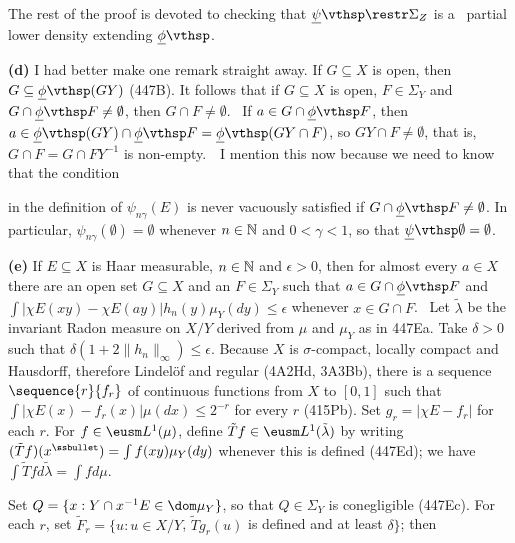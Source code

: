 {

\noindent The rest of the proof is devoted to checking that
$\undpsi\restr\Sigma_Z$ is a \lti\ partial lower density extending
$\undphi$.

\medskip

{\bf (d)} I had better make one remark straight away.   If
$G\subseteq X$ is open, then $G\subseteq\undphi(GY)$ (447B).
It follows that if $G\subseteq X$ is open, $F\in\Sigma_Y$ and
$G\cap\undphi F\ne\emptyset$, then $G\cap F\ne\emptyset$.   \Prf\ If
$a\in G\cap\undphi F$, then $a\in\undphi(GY)\cap\undphi F=\undphi(GY\cap
F)$, so $GY\cap F\ne\emptyset$, that is, $G\cap F=G\cap FY^{-1}$ is
non-empty.\ \QeD\  I mention this now because we need to know that the
condition


\noindent in the definition of $\psi_{n\gamma}(E)$ is never vacuously
satisfied if $G\cap\undphi F\ne\emptyset$.   In particular,
$\psi_{n\gamma}(\emptyset)=\emptyset$ whenever $n\in\Bbb N$ and
$0<\gamma<1$, so that $\undpsi\emptyset=\emptyset$.

\medskip

{\bf (e)} If $E\subseteq X$ is Haar measurable, $n\in\Bbb N$ and
$\epsilon>0$, then for almost every $a\in X$ there are an open set
$G\subseteq X$ and an $F\in\Sigma_Y$ such that $a\in G\cap\undphi F$ and
$\int|\chi E(xy)-\chi E(ay)|h_n(y)\mu_Y(dy)\le\epsilon$ whenever
$x\in G\cap F$.   \Prf\ Let
$\tilde\lambda$ be the invariant Radon measure on $X/Y$ derived from $\mu$
and $\mu_Y$ as in 447Ea.
Take $\delta>0$ such that
$\delta(1+2\|h_n\|_{\infty})\le\epsilon$.   Because $X$ is
$\sigma$-compact, locally compact and Hausdorff, therefore Lindel\"of
and regular (4A2Hd, 3A3Bb), there is a sequence
$\sequence{r}{f_r}$ of continuous functions from $X$ to $[0,1]$ such
that $\int|\chi E(x)-f_r(x)|\mu(dx)\le 2^{-r}$ for every $r$
(415Pb).   Set $g_r=|\chi E-f_r|$ for each $r$.
For $f\in\eusm L^1(\mu)$, define $\tilde Tf\in\eusm L^1(\tilde\lambda)$ by writing $(\tilde Tf)(x^{\ssbullet})=\int f(xy)\mu_Y(dy)$ whenever this is defined (447Ed);
we have $\int\tilde Tfd\tilde\lambda=\int fd\mu$.

Set $Q=\{x:Y\cap x^{-1}E\in\dom\mu_Y\}$, so that
$Q\in\Sigma_Y$ is conegligible (447Ec).   For each $r$, set
$\tilde F_r=\{u:u\in X/Y$, $\tilde Tg_r(u)$ is defined and at least
$\delta\}$;   then

}
